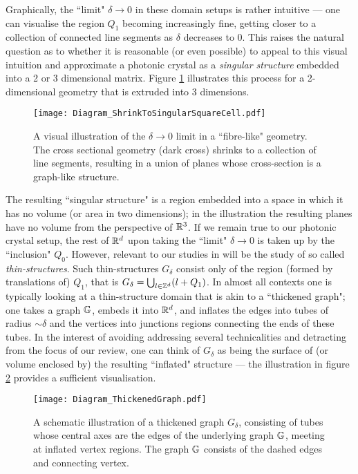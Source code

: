 Graphically, the ``limit" $\delta\rightarrow0$ in these domain setups is rather intuitive --- one can visualise the region $Q_1$ becoming increasingly fine, getting closer to a collection of connected line segments as $\delta$ decreases to 0.
This raises the natural question as to whether it is reasonable (or even possible) to appeal to this visual intuition and approximate a photonic crystal as a \emph{singular structure} embedded into a 2 or 3 dimensional matrix.
Figure \ref{fig:Diagram_ShrinkToSingularSquareCell} illustrates this process for a 2-dimensional geometry that is extruded into 3 dimensions.
\begin{figure}[h]
	\centering
	\texttt{[image: Diagram\_ShrinkToSingularSquareCell.pdf]}
	\caption{\label{fig:Diagram_ShrinkToSingularSquareCell} A visual illustration of the $\delta\rightarrow0$ limit in a ``fibre-like" geometry. The cross sectional geometry (dark cross) shrinks to a collection of line segments, resulting in a union of planes whose cross-section is a graph-like structure.}
\end{figure}
The resulting ``singular structure" is a region embedded into a space in which it has no volume (or area in two dimensions); in the illustration the resulting planes have no volume from the perspective of $\mathbb{R}^3$.
If we remain true to our photonic crystal setup, the rest of $\mathbb{R}^d$ upon taking the ``limit" $\delta\rightarrow0$ is taken up by the ``inclusion" $Q_0$.
However, relevant to our studies in  will be the study of so called \emph{thin-structures}.
Such thin-structures $G_{\delta}$ consist only of the region (formed by translations of) $Q_1$, that is $G_{\delta} = \bigcup_{l\in\mathbb{Z}^d}(l+Q_1)$.
In almost all contexts one is typically looking at a thin-structure domain that is akin to a ``thickened graph"; one takes a graph $\mathbb{G}$, embeds it into $\mathbb{R}^d$, and inflates the edges into tubes of radius $\sim\delta$ and the vertices into junctions regions connecting the ends of these tubes.
In the interest of avoiding addressing several technicalities and detracting from the focus of our review, one can think of $G_{\delta}$ as being the surface of (or volume enclosed by) the resulting ``inflated" structure --- the illustration in figure \ref{fig:Diagram_ThickenedGraph} provides a sufficient visualisation.
\begin{figure}[t]
	\centering
	\texttt{[image: Diagram\_ThickenedGraph.pdf]}
	\caption{\label{fig:Diagram_ThickenedGraph} A schematic illustration of a thickened graph $G_{\delta}$, consisting of tubes whose central axes are the edges of the underlying graph $\mathbb{G}$, meeting at inflated vertex regions. The graph $\mathbb{G}$ consists of the dashed edges and connecting vertex.}
\end{figure}

